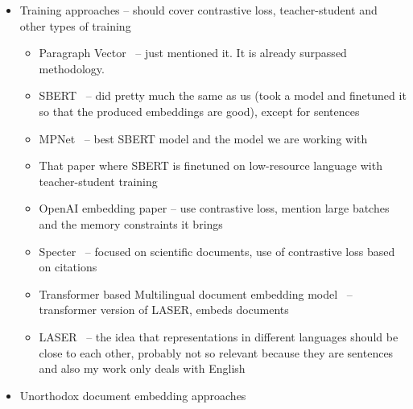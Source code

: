 \begin{itemize}
\begin{itemize}
\begin{itemize}
        \end{itemize}

    \end{itemize}

  \item Training approaches -- should cover contrastive loss, teacher-student
    and other types of training

    \begin{itemize}

      \item Paragraph Vector~\cite{le2014distributed} -- just mentioned it. It is
        already surpassed methodology.

      \item SBERT~\cite{reimers2019sentence} -- did pretty much the same as us
        (took a model and finetuned it so that the produced embeddings are good),
        except for sentences

      \item MPNet~\cite{song2020mpnet} -- best SBERT model and the model we are
        working with

      \item That paper where SBERT is finetuned on low-resource language with
        teacher-student training

      \item OpenAI embedding paper -- use contrastive loss, mention large batches
        and the memory constraints it brings

      \item Specter~\cite{cohan2020specter} -- focused on scientific documents, use
        of contrastive loss based on citations

      \item Transformer based Multilingual document embedding
        model~\cite{li2020transformer} -- transformer version of LASER, embeds
        documents

      \item LASER~\cite{schwenk2017learning} -- the idea that representations in
        different languages should be close to each other, probably not so relevant
        because they are sentences and also my work only deals with English

    \end{itemize}

  \item Unorthodox document embedding approaches

    \begin{itemize}


\end{itemize}
\end{itemize}

